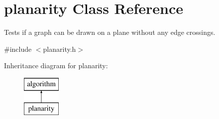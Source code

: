 \hypertarget{classplanarity}{}\section{planarity Class Reference}
\label{classplanarity}


Tests if a graph can be drawn on a plane without any edge crossings.  




{\ttfamily \#include $<$planarity.\+h$>$}

Inheritance diagram for planarity\+:\begin{figure}[H]
\begin{center}
\leavevmode
\includegraphics[height=2.000000cm]{classplanarity}
\end{center}
\end{figure}
